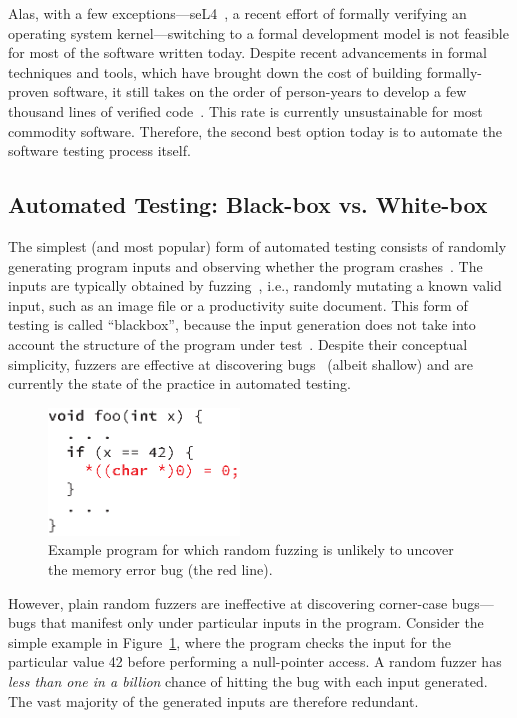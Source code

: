 Alas, with a few exceptions---seL4~\cite{seL4}, a recent effort of formally verifying an operating system kernel---switching to a formal development model is not feasible for most of the software written today.
%
Despite recent advancements in formal techniques and tools, which have brought down the cost of building formally-proven software, it still takes on the order of person-years to develop a few thousand lines of verified code~\cite{seL4}.
%
This rate is currently unsustainable for most commodity software.
%
Therefore, the second best option today is to automate the software testing process itself.


\subsection{Automated Testing: Black-box vs. White-box}

The simplest (and most popular) form of automated testing consists of randomly generating program inputs and observing whether the program crashes~\cite{fuzz,quickcheck,afl,autodafe,skipfish}.
%
The inputs are typically obtained by fuzzing~\cite{fuzz}, i.e., randomly mutating a known valid input, such as an image file or a productivity suite document.  This form of testing is called ``blackbox'', because the input generation does not take into account the structure of the program under test~\cite{blackbox-testing}.
%
Despite their conceptual simplicity, fuzzers are effective at discovering  bugs~\cite{afl,autodafe,skipfish} (albeit shallow) and are currently the state of the practice in automated testing.

\begin{figure}
  \centering
  \includegraphics[width=2.0in]{figures/intro/fuzzing-example}
  \caption{Example program for which random fuzzing is unlikely to uncover the memory error bug (the red line).}
  \label{fig:intro:fuzzing}
\end{figure}

However, plain random fuzzers are ineffective at discovering corner-case bugs---bugs that manifest only under particular inputs in the program.
%
Consider the simple example in Figure~\ref{fig:intro:fuzzing}, where the program checks the input for the particular value 42 before performing a null-pointer access.  A random fuzzer has \emph{less than one in a billion} chance of hitting the bug with each input generated.
%
The vast majority of the generated inputs are therefore redundant.

